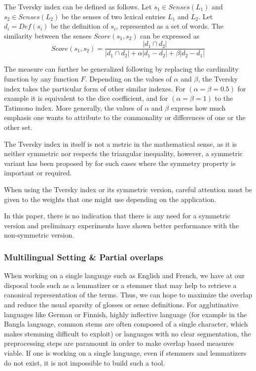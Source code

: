 \documentclass[10pt,a4paper,twoside]{article}
\begin{document}
The Tversky index can be defined as follows. Let \(s_1 \in Senses(L_1)\)  and \(s_2 \in Senses(L_2)\) be the senses of two lexical entries \(L_1\) and \(L_2\). Let \(d_i=Def(s_i)\) be the definition of \(s_i\), represented as a set of words. The similarity between the senses \(Score(s_1, s_2)\) can be expressed as 
\[
Score(s_1,s_2) = 
\frac{|d_1\cap d_2|}{|d_1\cap d_2| + \alpha |d_1-d_2| + \beta |d_2-d_1|}
\]

The measure can further be generalized following \cite{DBLP:conf/otm/PirroE10} by replacing the cardinality function by any function \(F\). Depending on the values of \(\alpha\) and \(\beta\), the Tversky index takes the particular form of other similar indexes. For \((\alpha=\beta=0.5)\) for example it is equivalent to the dice coefficient, and for  \((\alpha=\beta=1)\) to the Tatimono index. More generally, the values of \(\alpha\) and \(\beta\) express how much emphasis one wants to attribute to the commonality or differences of one or the other set.

 The Tversky index in itself is not a metric in the mathematical sense, as it is neither symmetric nor respects the triangular inequality, however, a symmetric variant has been proposed by \cite{Jimenez2010} for such cases where the symmetry property is important or required.
% 
 
 When using the Tversky index or its symmetric version, careful attention must be given to the weights that one might use depending on the application. 
 
 In this paper, there is no indication that there is any need for a symmetric version and preliminary experiments have shown better performance with the non-symmetric version.

\subsubsection{Multilingual Setting \& Partial overlaps}
 When working on a single language such as English and French, we have at our disposal tools such as a lemmatizer or a stemmer that may help to retrieve a canonical representation of the terms. Thus, we can hope to maximize the overlap and reduce the usual sparsity of glosses or sense definitions. For agglutinative languages like German or Finnish, highly inflective language (for example in the Bangla language, common stems are often composed of a single character, which makes stemming difficult to exploit) or languages with no clear segmentation, the preprocessing steps are paramount in order to make overlap based measures viable. If one is working on a single language, even if stemmers and lemmatizers do not exist, it is not impossible to build such a tool.
\end{document}
